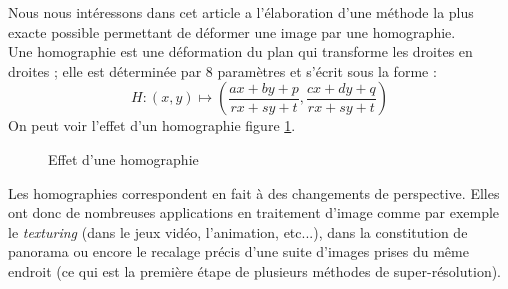 



	Nous nous intéressons dans cet article a l'élaboration d'une méthode la plus exacte possible permettant de déformer une image par une homographie. \\
 	Une homographie est une déformation du plan qui transforme les droites en droites ; elle est déterminée par 8 paramètres et s'écrit sous la forme :
	\[H : (x,y)\mapsto\left( \frac{ax+by+p}{rx+sy+t},\frac{cx+dy+q}{rx+sy+t}\right)\] 
On peut voir l'effet d'un homographie figure \ref{effethom}.\\

 \begin{figure}
 
   \centering
    \arrowPDP 
   \caption{Effet d'une homographie}
\label{effethom}
 \end{figure}

	Les homographies correspondent en fait à des changements de perspective. Elles ont donc de nombreuses applications en traitement d'image comme par exemple le \emph{texturing} (dans le jeux vidéo, l'animation, etc...), dans la constitution de panorama ou encore le recalage précis d'une suite d'images prises du même endroit (ce qui est la première étape de plusieurs méthodes de super-résolution).


